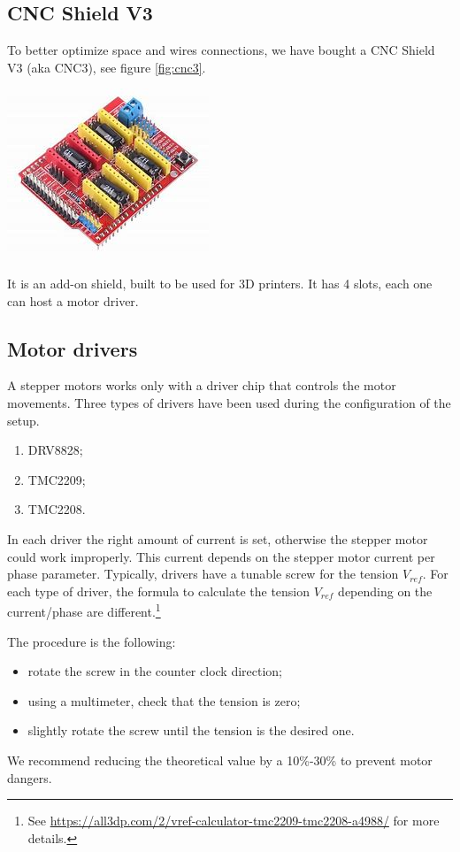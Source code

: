 \documentclass{article}
\begin{document}
\begin{multicols}{2}
        \subsection{CNC Shield V3}
        To better optimize space and wires connections, we have bought a CNC Shield V3 (aka CNC3), see figure \ref{fig:cnc3}.
        \begin{minipage}
            {0.5\textwidth}
            \centering
            \includegraphics[scale=0.5]{CNC3.jpg}
            \label{fig:cnc3}
        \end{minipage}
        It is an add-on shield, built to be used for 3D printers.
        It has 4 slots, each one can host a motor driver.

        \subsection{Motor drivers}
        A stepper motors works only with a driver chip that controls the motor movements.
        Three types of drivers have been used during the configuration of the setup.
        \begin{enumerate}
            \item DRV8828;
            \item TMC2209;
            \item TMC2208.
        \end{enumerate}
        
        In each driver the right amount of current is set, otherwise the stepper motor could work improperly.
        This current depends on the stepper motor current per phase parameter.
        Typically, drivers have a tunable screw for the tension \(V_{ref}\).
        For each type of driver, the formula to calculate the tension \(V_{ref}\) depending on the current/phase are different.\footnote{See \url{https://all3dp.com/2/vref-calculator-tmc2209-tmc2208-a4988/} for more details.}

        The procedure is the following:
        \begin{itemize}
            \item rotate the screw in the counter clock direction;
            \item using a multimeter, check that the tension is zero;
            \item slightly rotate the screw until the tension is the desired one.
        \end{itemize}
        We recommend reducing the theoretical value by a 10\%-30\% to prevent motor dangers.


\end{multicols}
\end{document}
